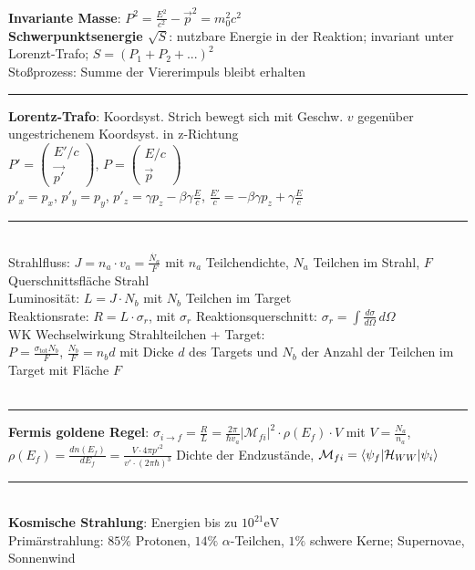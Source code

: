 \documentclass[10pt,twoside,a4paper]{article}
\newcommand{\Vek}[2]{\left(\begin{array}{c}#1\\#2\end{array}\right)}
\begin{document}
\begin{multicols*}{3}
\textbf{Invariante Masse}: $P^2 = \frac{E^2}{c^2} - \vec{p}^2 = m^2_0 c^2$ \\
\textbf{Schwerpunktsenergie $\sqrt{S}$}: nutzbare Energie in der Reaktion; invariant unter Lorenzt-Trafo; $S = (P_1 + P_2 + ...)^2$  \\
Stoßprozess: Summe der Viererimpuls bleibt erhalten
\\ \rule[0ex]{\columnwidth}{0.5pt}
\textbf{Lorentz-Trafo}: Koordsyst. Strich bewegt sich mit Geschw. $v$ gegenüber ungestrichenem Koordsyst. in z-Richtung \\
$P' = \Vek{E'/c}{\vec{p'}}$, $P = \Vek{E/c}{\vec{p}}$ \\
$p'_x = p_x$, $p'_y = p_y$, $p'_z = \gamma p_z - \beta \gamma \frac{E}{c}$, $\frac{E'}{c} = - \beta \gamma p_z + \gamma \frac{E}{c}$
\\ \rule[0ex]{\columnwidth}{0.5pt}
\ \\
Strahlfluss: $J = n_a \cdot v_a = \frac{\dot{N_a}}{F}$ mit $n_a$ Teilchendichte, $N_a$ Teilchen im Strahl, $F$ Querschnittsfläche Strahl \\
Luminosität: $L = J \cdot N_b$ mit $N_b$ Teilchen im Target \\
Reaktionsrate: $R = L \cdot \sigma_r$, mit $\sigma_r$ Reaktionsquerschnitt: $\sigma_r = \int \frac{d\sigma}{d\Omega} \,d\Omega$  \\
WK Wechselwirkung Strahlteilchen + Target: \\
$P = \frac{\sigma_{\text{tot}} N_{b}}{F}$, $\frac{N_{b}}{F} = n_{b} d$ mit Dicke $d$ des Targets und $N_b$ der Anzahl der Teilchen im Target mit Fläche $F$ \\
\\ \rule[0ex]{\columnwidth}{0.5pt}
\textbf{Fermis goldene Regel}: $\sigma_{i \rightarrow f} = \frac{R}{L} = \frac{2 \pi}{\hbar v_a} \left| \mathcal{M}_{fi} \right| ^2 \cdot \rho \left( E_f \right) \cdot V$ mit $V = \frac{N_a}{n_a}$, $\rho \left( E_f \right) = \frac{dn \left( E_f \right)}{dE_f} = \frac{V \cdot 4 \pi p'^2}{v' \cdot (2 \pi \hbar)^3}$ Dichte der Endzustände, $\mathcal{M}_{fi} = \braket{\psi_f|\mathcal{H}_{WW}|\psi_i}$
\\ \rule[0ex]{\columnwidth}{0.5pt}
\ \\
\textbf{Kosmische Strahlung}: Energien bis zu $10^{21} \si{\eV}$ \\
Primärstrahlung: $85\%$ Protonen, $14\%$ $\alpha$-Teilchen, $1\%$ schwere Kerne; Supernovae, Sonnenwind \\

\end{multicols*}
\end{document}
